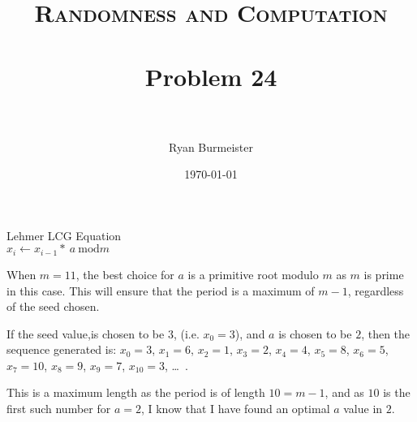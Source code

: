 \documentclass[fontsize=12pt]{article}
\title{ 
  \normalfont \normalsize 
  \textsc{Randomness and Computation} \\ [25pt] %
  \horrule{0.5pt} \\[0.4cm] %
  \huge Problem 24 \\ %
  \horrule{2pt} \\[0.5cm] %
}
\author{Ryan Burmeister} %
\date{\normalsize\today} %
\numberwithin{equation}{section} %
\numberwithin{figure}{section} %
\numberwithin{table}{section} %
\begin{document}
\maketitle %
\begin{center}
Lehmer LCG Equation \\
$x_i \leftarrow x_{i-1}*\ a\ \text{mod} m$
\end{center}
When $m=11$, the best choice for $a$ is a primitive root modulo $m$ as $m$ is
prime in this case.  This will ensure that the period is a maximum of $m-1$,
regardless of the seed chosen.

If the seed value,is chosen to be $3$, (i.e. $x_0=3$), and $a$ is chosen to be
$2$, then the sequence generated is: $x_0=3$, $x_1=6$, $x_2=1$, $x_3=2$,
$x_4=4$, $x_5=8$, $x_6=5$, $x_7=10$, $x_8=9$, $x_9=7$, $x_{10}=3$, \ldots\ .

This is a maximum length as the period is of length $10=m-1$, and as $10$ is the
first such number for $a=2$, I know that I have found an optimal $a$ value in $2$.
\end{document}
